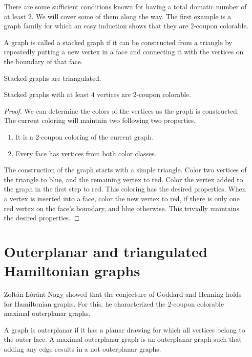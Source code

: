 There are some sufficient conditions known for having a total domatic number of
at least $2$. We will cover some of them along the way.
The first example is a graph family for which an easy induction shows that they
are $2$-coupon colorable.

\begin{definition}
  A graph is called a stacked graph if it can be constructed from a triangle by
  repeatedly putting a new vertex in a face and connecting it with the vertices on
  the boundary of that face.
\end{definition}
\begin{remark}
  Stacked graphs are triangulated.
\end{remark}
\begin{claim}
  Stacked graphs with at least $4$ vertices are $2$-coupon colorable.
\end{claim}
\begin{proof}
  We can determine the colors of the vertices as the graph is constructed. The
  current coloring will maintain two following two properties.
  \begin{enumerate}
    \item It is a $2$-coupon coloring of the current graph.
    \item Every face has vertices from both color classes.
  \end{enumerate}
  The construction of the graph starts with a simple triangle. Color two vertices
  of the triangle to blue, and the remaining vertex to red. Color the vertex added
  to the graph in the first step to red. This coloring has the desired properties.
  When a vertex is inserted into a face, color the new vertex to red, if there is
  only one red vertex on the face's boundary, and blue otherwise. This trivially
  maintains the desired properties.
\end{proof}

\section{Outerplanar and triangulated Hamiltonian graphs}
Zoltán Lóránt Nagy showed that the conjecture of Goddard and Henning holds for
Hamiltonian graphs. For this, he characterized the $2$-coupon colorable
maximal outerplanar graphs.

\begin{definition}
   A graph is outerplanar if it has a planar drawing for which all vertices
   belong to the outer face. A maximal outerplanar graph is an outerplanar graph
   such that adding any edge results in a not outerplanar graphs.
\end{definition}

